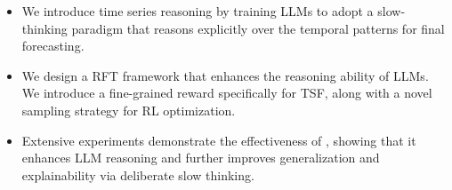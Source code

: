 \begin{itemize}[leftmargin=10pt, itemsep=1pt]
  \item We introduce time series reasoning by training LLMs to adopt a slow-thinking paradigm that reasons explicitly over the temporal patterns for final forecasting.
  \item We design a RFT framework that enhances the reasoning ability of LLMs. We introduce a fine-grained reward specifically for TSF, along with a novel sampling strategy for RL optimization.
  \item Extensive experiments demonstrate the effectiveness of \Ours, showing that it enhances LLM reasoning and further improves generalization and explainability via deliberate slow thinking.
\end{itemize}

